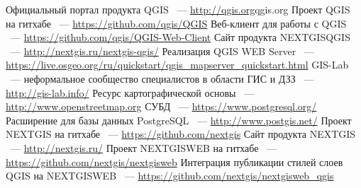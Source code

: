 \documentclass[10pt, a5paper]{article}
\begin{document}
\begin{thebibliography}{99}

Официальный портал продукта QGIS ~---  \url{http://qgis.org}{qgis.org}
Проект QGIS на гитхабе ~--- \url{https://github.com/qgis/QGIS}
Веб-клиент для работы с QGIS ~--- \url{https://github.com/qgis/QGIS-Web-Client}
Сайт продукта NEXTGISQGIS ~--- \url{http://nextgis.ru/nextgis-qgis/}
Реализация QGIS WEB Server ~--- \url{https://live.osgeo.org/ru/quickstart/qgis_mapserver_quickstart.html}
GIS-Lab ~--- неформальное сообщество специалистов в области ГИС и ДЗЗ ~--- \url{http://gis-lab.info/}
Ресурс картографической основы ~--- \url{http://www.openstreetmap.org}
СУБД ~--- \url{https://www.postgresql.org/}
Расширение для базы данных PostgreSQL ~---  \url{http://www.postgis.net/}
Проект NEXTGIS на гитхабе ~--- \url{https://github.com/nextgis}
Сайт продукта NEXTGIS ~--- \url{http://nextgis.ru/}
Проект NEXTGISWEB на гитхабе ~--- \url{https://github.com/nextgis/nextgisweb}
Интеграция публикации стилей слоев QGIS на NEXTGISWEB ~--- \url{https://github.com/nextgis/nextgisweb_qgis}
\end{thebibliography}
\end{document}

